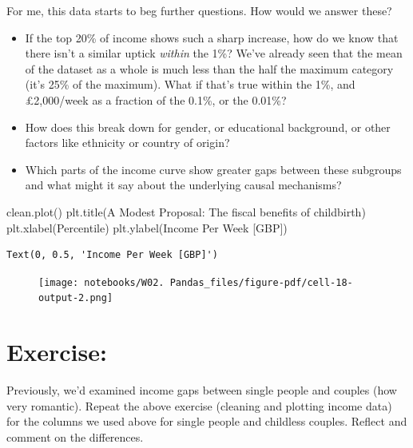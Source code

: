 \documentclass[
  letterpaper,
  DIV=11,
  numbers=noendperiod]{scrreprt}
\newenvironment{Shaded}{\begin{snugshade}}{\end{snugshade}}
\newcommand{\NormalTok}[1]{\textcolor[rgb]{0.00,0.23,0.31}{#1}}
\newcommand{\StringTok}[1]{\textcolor[rgb]{0.13,0.47,0.30}{#1}}
\begin{document}
For me, this data starts to beg further questions. How would we answer
these?

\begin{itemize}
\item
  If the top 20\% of income shows such a sharp increase, how do we know
  that there isn't a similar uptick \emph{within} the 1\%? We've already
  seen that the mean of the dataset as a whole is much less than the
  half the maximum category (it's 25\% of the maximum). What if that's
  true within the 1\%, and £2,000/week as a fraction of the 0.1\%, or
  the 0.01\%?
\item
  How does this break down for gender, or educational background, or
  other factors like ethnicity or country of origin?
\item
  Which parts of the income curve show greater gaps between these
  subgroups and what might it say about the underlying causal
  mechanisms?
\end{itemize}

\begin{Shaded}
\begin{Highlighting}[]
\NormalTok{clean.plot()}
\NormalTok{plt.title(}\StringTok{\textquotesingle{}A Modest Proposal: The fiscal benefits of childbirth\textquotesingle{}}\NormalTok{)}
\NormalTok{plt.xlabel(}\StringTok{\textquotesingle{}Percentile\textquotesingle{}}\NormalTok{)}
\NormalTok{plt.ylabel(}\StringTok{\textquotesingle{}Income Per Week [GBP]\textquotesingle{}}\NormalTok{)}
\end{Highlighting}
\end{Shaded}

\begin{verbatim}
Text(0, 0.5, 'Income Per Week [GBP]')
\end{verbatim}

\begin{figure}[H]

{\centering \texttt{[image: notebooks/W02. Pandas\_files/figure-pdf/cell-18-output-2.png]}

}

\end{figure}

\hypertarget{exercise-1}{%
\section{Exercise:}\label{exercise-1}}

Previously, we'd examined income gaps between single people and couples
(how very romantic). Repeat the above exercise (cleaning and plotting
income data) for the columns we used above for single people and
childless couples. Reflect and comment on the differences.
\end{document}
